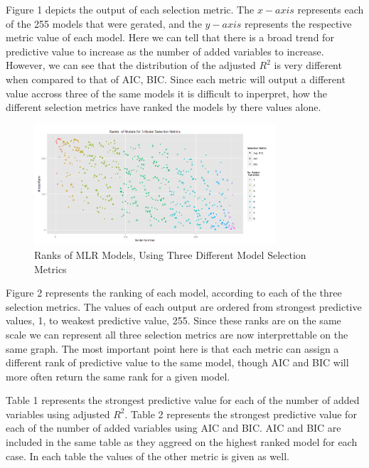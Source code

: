 \documentclass{article}\usepackage[]{graphicx}\usepackage[]{color}
\begin{document}
  Figure 1 depicts the output of each selection metric.  The $x-axis$ represents each of the 255 models that were gerated, and the $y-axis$ represents the respective metric value of each model.  Here we can tell that there is a broad trend for predictive value to increase as the number of added variables to increase.  However, we can see that the distribution of the adjusted $R^2$ is very different when compared to that of AIC, BIC. Since each metric will output a different value accross three of the same models it is difficult to inperpret, how the different selection metrics have ranked the models by there values alone. 
  
\begin{figure}[h]
\begin{center}
    \centering
    \includegraphics[width=0.8\textwidth]{rank1.png}
    \caption{Ranks of MLR Models, Using Three Different  Model Selection Metrics}
    \label{fig:awesome_image}
\end{center}
\end{figure}  
  Figure 2 represents the ranking of each model, according to each of the three selection metrics. The values of each output are ordered from strongest predictive values, 1, to weakest predictive value, 255.  Since these ranks are on the same scale we can represent all three selection metrics are now interprettable on the same graph.  The most important point here is that each metric can assign a different rank of predictive value to the same model, though AIC and BIC will more often return the same rank for a given model.

Table 1 represents the strongest predictive value for each of the number of added variables using adjusted $R^2$. Table 2 represents the strongest predictive value for each of the number of added variables using AIC and BIC.  AIC and BIC are included in the same table as they aggreed on the highest ranked model for each case. In each table the values of the other metric is given as well. 
\end{document}

